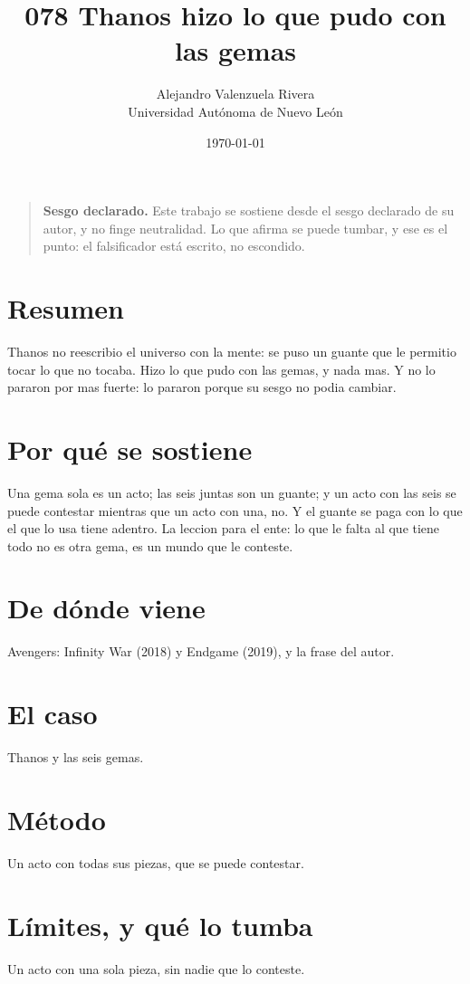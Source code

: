 \documentclass[11pt,a4paper]{article}
\title{078 Thanos hizo lo que pudo con las gemas}
\author{Alejandro Valenzuela Rivera\\\small Universidad Autónoma de Nuevo León}
\date{\today}
\begin{document}
\maketitle

\begin{quote}
\textbf{Sesgo declarado.} Este trabajo se sostiene desde el sesgo declarado de su autor, y no finge neutralidad. Lo que afirma se puede tumbar, y ese es el punto: el falsificador está escrito, no escondido.
\end{quote}

\section*{Resumen}
Thanos no reescribio el universo con la mente: se puso un guante que le permitio tocar lo que no tocaba. Hizo lo que pudo con las gemas, y nada mas. Y no lo pararon por mas fuerte: lo pararon porque su sesgo no podia cambiar.

\section{Por qué se sostiene}
Una gema sola es un acto; las seis juntas son un guante; y un acto con las seis se puede contestar mientras que un acto con una, no. Y el guante se paga con lo que el que lo usa tiene adentro. La leccion para el ente: lo que le falta al que tiene todo no es otra gema, es un mundo que le conteste.

\section{De dónde viene}
Avengers: Infinity War (2018) y Endgame (2019), y la frase del autor.

\section{El caso}
Thanos y las seis gemas.

\section{Método}
Un acto con todas sus piezas, que se puede contestar.

\section{Límites, y qué lo tumba}
Un acto con una sola pieza, sin nadie que lo conteste.
\end{document}

